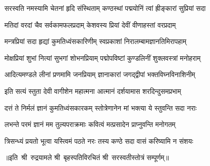 
\twolineshloka
{सरस्वति नमस्यामि चेतनां हृदि संस्थिताम्}
{कण्ठस्थां पद्मयोनिं त्वां ह्रीङ्कारां सुप्रियां सदा}

\twolineshloka
{मतिदां वरदां चैव सर्वकामफलप्रदाम्}
{केशवस्य प्रियां देवीं वीणाहस्तां वरप्रदाम्}

\twolineshloka
{मन्त्रप्रियां सदा हृद्यां कुमतिध्वंसकारिणीम्}
{स्वप्रकाशां निरालम्बामज्ञानतिमिरापहाम्}

\twolineshloka
{मोक्षप्रियां शुभां नित्यां सुभगां शोभनप्रियाम्}
{पद्मोपविष्टां कुण्डलिनीं शुक्लवस्त्रां मनोहराम्}

\twolineshloka
{आदित्यमण्डले लीनां प्रणमामि जनप्रियाम्}
{ज्ञानाकारां जगद्द्वीपां भक्तविघ्नविनाशिनीम्}

\twolineshloka
{इति सत्यं स्तुता देवी वागीशेन महात्मना}
{आत्मानं दर्शयामास शरदिन्दुसमप्रभाम्}



\twolineshloka
{दत्तं ते निर्मलं ज्ञानं कुमतिध्वंसकारकम्}
{स्तोत्रेणानेन मां भक्त्या ये स्तुवन्ति सदा नराः}

\twolineshloka
{लभन्ते परमं ज्ञानं मम तुल्यपराक्रमाः}
{कवित्वं मत्प्रसादेन प्राप्नुवन्ति मनोगतम्}

\twolineshloka
{त्रिसन्ध्यं प्रयतो भूत्वा यस्त्विमं पठते नरः}
{तस्य कण्ठे सदा वासं करिष्यामि न संशयः}

॥इति~श्री~रुद्रयामले श्री~बृहस्पतिविरचितं श्री~सरस्वतीस्तोत्रं सम्पूर्णम्॥
